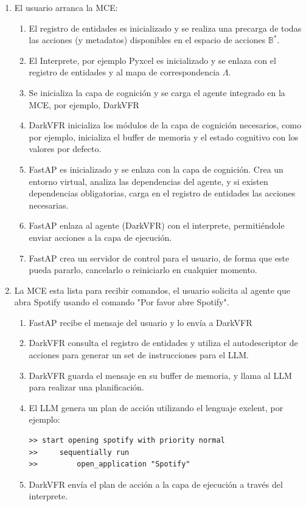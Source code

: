 \begin{enumerate}
    \item El usuario arranca la MCE:
    \begin{enumerate}
        \item El registro de entidades es inicializado y se realiza una precarga 
        de todas las acciones (y metadatos) disponibles en el espacio de acciones \(\mathbb{B}^*\).
        \item El Interprete, por ejemplo Pyxcel es inicializado y se enlaza con el registro de entidades 
        y al mapa de correspondencia \(\Lambda\).
        \item Se inicializa la capa de cognición y se carga el agente integrado en 
        la MCE, por ejemplo, DarkVFR
        \item DarkVFR inicializa los módulos de la capa de cognición necesarios, como por ejemplo,
        inicializa el buffer de memoria y el estado cognitivo con los valores por defecto.
        \item FastAP es inicializado y se enlaza con la capa de cognición. Crea un entorno virtual,
        analiza las dependencias del agente, y si existen dependencias obligatorias, carga en el 
        registro de entidades las acciones necesarias.
        \item FastAP enlaza al agente (DarkVFR) con el interprete, permitiéndole enviar acciones a
        la capa de ejecución.
        \item FastAP crea un servidor de control para el usuario, de forma que este pueda pararlo,
        cancelarlo o reiniciarlo en cualquier momento.
    \end{enumerate}

    \item La MCE esta lista para recibir comandos, el usuario solicita al agente que abra Spotify 
    usando el comando "Por favor abre Spotify".

    \begin{enumerate}   
        \item FastAP recibe el mensaje del usuario y lo envía a DarkVFR
        \item DarkVFR consulta el registro de entidades y utiliza el autodescriptor de acciones para generar un set
        de instrucciones para el LLM.
        \item DarkVFR guarda el mensaje en su buffer de memoria, y llama al LLM para realizar 
        una planificación.
        \item El LLM genera un plan de acción utilizando el lenguaje exelent, por ejemplo:
        \begin{lstlisting}[caption={Plan de acción generado por el LLM}, label={cod:llm_plan_example}]
>> start opening spotify with priority normal
>>     sequentially run
>>         open_application "Spotify"
        \end{lstlisting}
        \item DarkVFR envía el plan de acción a la capa de ejecución a través del interprete.
    \end{enumerate}


\end{enumerate}
